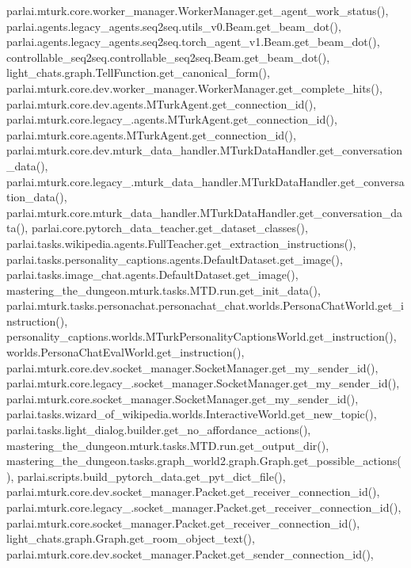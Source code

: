 parlai.\+mturk.\+core.\+worker\+\_\+manager.\+Worker\+Manager.\+get\+\_\+agent\+\_\+work\+\_\+status(), parlai.\+agents.\+legacy\+\_\+agents.\+seq2seq.\+utils\+\_\+v0.\+Beam.\+get\+\_\+beam\+\_\+dot(), parlai.\+agents.\+legacy\+\_\+agents.\+seq2seq.\+torch\+\_\+agent\+\_\+v1.\+Beam.\+get\+\_\+beam\+\_\+dot(), controllable\+\_\+seq2seq.\+controllable\+\_\+seq2seq.\+Beam.\+get\+\_\+beam\+\_\+dot(), light\+\_\+chats.\+graph.\+Tell\+Function.\+get\+\_\+canonical\+\_\+form(), parlai.\+mturk.\+core.\+dev.\+worker\+\_\+manager.\+Worker\+Manager.\+get\+\_\+complete\+\_\+hits(), parlai.\+mturk.\+core.\+dev.\+agents.\+M\+Turk\+Agent.\+get\+\_\+connection\+\_\+id(), parlai.\+mturk.\+core.\+legacy\+\_.\+agents.\+M\+Turk\+Agent.\+get\+\_\+connection\+\_\+id(), parlai.\+mturk.\+core.\+agents.\+M\+Turk\+Agent.\+get\+\_\+connection\+\_\+id(), parlai.\+mturk.\+core.\+dev.\+mturk\+\_\+data\+\_\+handler.\+M\+Turk\+Data\+Handler.\+get\+\_\+conversation\+\_\+data(), parlai.\+mturk.\+core.\+legacy\+\_.\+mturk\+\_\+data\+\_\+handler.\+M\+Turk\+Data\+Handler.\+get\+\_\+conversation\+\_\+data(), parlai.\+mturk.\+core.\+mturk\+\_\+data\+\_\+handler.\+M\+Turk\+Data\+Handler.\+get\+\_\+conversation\+\_\+data(), parlai.\+core.\+pytorch\+\_\+data\+\_\+teacher.\+get\+\_\+dataset\+\_\+classes(), parlai.\+tasks.\+wikipedia.\+agents.\+Full\+Teacher.\+get\+\_\+extraction\+\_\+instructions(), parlai.\+tasks.\+personality\+\_\+captions.\+agents.\+Default\+Dataset.\+get\+\_\+image(), parlai.\+tasks.\+image\+\_\+chat.\+agents.\+Default\+Dataset.\+get\+\_\+image(), mastering\+\_\+the\+\_\+dungeon.\+mturk.\+tasks.\+M\+T\+D.\+run.\+get\+\_\+init\+\_\+data(), parlai.\+mturk.\+tasks.\+personachat.\+personachat\+\_\+chat.\+worlds.\+Persona\+Chat\+World.\+get\+\_\+instruction(), personality\+\_\+captions.\+worlds.\+M\+Turk\+Personality\+Captions\+World.\+get\+\_\+instruction(), worlds.\+Persona\+Chat\+Eval\+World.\+get\+\_\+instruction(), parlai.\+mturk.\+core.\+dev.\+socket\+\_\+manager.\+Socket\+Manager.\+get\+\_\+my\+\_\+sender\+\_\+id(), parlai.\+mturk.\+core.\+legacy\+\_.\+socket\+\_\+manager.\+Socket\+Manager.\+get\+\_\+my\+\_\+sender\+\_\+id(), parlai.\+mturk.\+core.\+socket\+\_\+manager.\+Socket\+Manager.\+get\+\_\+my\+\_\+sender\+\_\+id(), parlai.\+tasks.\+wizard\+\_\+of\+\_\+wikipedia.\+worlds.\+Interactive\+World.\+get\+\_\+new\+\_\+topic(), parlai.\+tasks.\+light\+\_\+dialog.\+builder.\+get\+\_\+no\+\_\+affordance\+\_\+actions(), mastering\+\_\+the\+\_\+dungeon.\+mturk.\+tasks.\+M\+T\+D.\+run.\+get\+\_\+output\+\_\+dir(), mastering\+\_\+the\+\_\+dungeon.\+tasks.\+graph\+\_\+world2.\+graph.\+Graph.\+get\+\_\+possible\+\_\+actions(), parlai.\+scripts.\+build\+\_\+pytorch\+\_\+data.\+get\+\_\+pyt\+\_\+dict\+\_\+file(), parlai.\+mturk.\+core.\+dev.\+socket\+\_\+manager.\+Packet.\+get\+\_\+receiver\+\_\+connection\+\_\+id(), parlai.\+mturk.\+core.\+legacy\+\_.\+socket\+\_\+manager.\+Packet.\+get\+\_\+receiver\+\_\+connection\+\_\+id(), parlai.\+mturk.\+core.\+socket\+\_\+manager.\+Packet.\+get\+\_\+receiver\+\_\+connection\+\_\+id(), light\+\_\+chats.\+graph.\+Graph.\+get\+\_\+room\+\_\+object\+\_\+text(), parlai.\+mturk.\+core.\+dev.\+socket\+\_\+manager.\+Packet.\+get\+\_\+sender\+\_\+connection\+\_\+id(), 